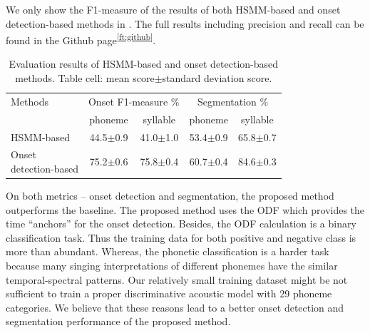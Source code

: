 We only show the F1-measure of the results of both HSMM-based and onset detection-based methods in . The full results including precision and recall can be found in the Github page\textsuperscript{\ref{ft:github}}. 

\begin{table}[ht]
  \centering
  \caption{Evaluation results of HSMM-based and onset detection-based methods. Table cell: mean score$\pm$standard deviation score.}
  \label{table:ch5:results_onset}
  \begin{tabular}{l|cccc}
    \toprule
    Methods & \multicolumn{2}{c}{Onset F1-measure \%} & \multicolumn{2}{c}{Segmentation \%} \\
            & phoneme & syllable &  phoneme & syllable \\
    \midrule
    HSMM-based & 44.5$\pm$0.9 & 41.0$\pm$1.0 & 53.4$\pm$0.9 & 65.8$\pm$0.7 \\

    \makecell[l]{Onset\\detection-based} & 75.2$\pm$0.6 & 75.8$\pm$0.4 & 60.7$\pm$0.4 & 84.6$\pm$0.3 \\
    \bottomrule
  \end{tabular}
\end{table}

On both metrics -- onset detection and segmentation, the proposed method outperforms the baseline. The proposed method uses the ODF which provides the time ``anchors'' for the onset detection. Besides, the ODF calculation is a binary classification task. Thus the training data for both positive and negative class is more than abundant. Whereas, the phonetic classification is a harder task because many singing interpretations of different phonemes have the similar temporal-spectral patterns. Our relatively small training dataset might be not sufficient to train a proper discriminative acoustic model with 29 phoneme categories. We believe that these reasons lead to a better onset detection and segmentation performance of the proposed method.

